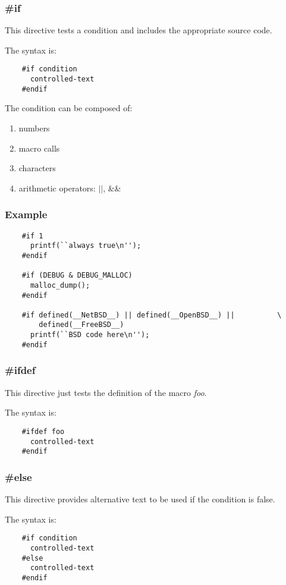 \begin{frame}[containsverbatim]
  \frametitle{\textbf{\#if}}

  This directive tests a condition and includes the appropriate source code.

  \nl

  The syntax is:

  \begin{verbatim}
    #if condition
      controlled-text
    #endif
  \end{verbatim}

  The condition can be composed of:

  \begin{enumerate}
    \item
      numbers
    \item
      macro calls
    \item
      characters
    \item
      arithmetic operators: $||$, \&\&
  \end{enumerate}
\end{frame}


\begin{frame}[containsverbatim]
  \frametitle{Example}

  \begin{verbatim}
    #if 1
      printf(``always true\n'');
    #endif

    #if (DEBUG & DEBUG_MALLOC)
      malloc_dump();
    #endif

    #if defined(__NetBSD__) || defined(__OpenBSD__) ||          \
        defined(__FreeBSD__)
      printf(``BSD code here\n'');
    #endif
  \end{verbatim}
\end{frame}


\begin{frame}[containsverbatim]
  \frametitle{\textbf{\#ifdef}}

  This directive just tests the definition of the macro \textit{foo}.

  \nl

  The syntax is:

  \begin{verbatim}
    #ifdef foo
      controlled-text
    #endif
  \end{verbatim}
\end{frame}


\begin{frame}[containsverbatim]
  \frametitle{\textbf{\#else}}

  This directive provides alternative text to be used if the condition
  is false.

  \nl

  The syntax is:

  \begin{verbatim}
    #if condition
      controlled-text
    #else
      controlled-text
    #endif
  \end{verbatim}
\end{frame}

